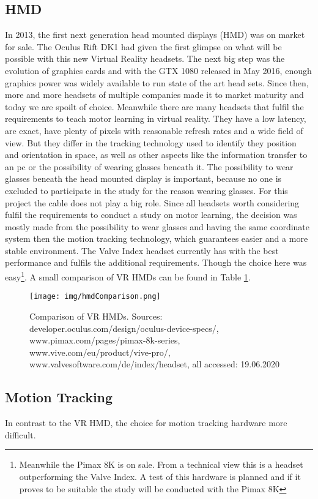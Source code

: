 \subsection{HMD}
In 2013, the first next generation head mounted displays (HMD) was on market for sale. The Oculus Rift DK1 had given the first glimpse on what will be possible with this new Virtual Reality headsets. The next big step was the evolution of graphics cards and with the GTX 1080 released in May 2016, enough graphics power was widely available to run state of the art head sets. Since then, more and more headsets of multiple companies made it to market maturity and today we are spoilt of choice. Meanwhile there are many headsets that fulfil the requirements to teach motor learning in virtual reality. They have a low latency,  are exact, have plenty of pixels with reasonable refresh rates and a wide field of view. But they differ in the tracking technology used to identify they position and orientation in space, as well as other aspects like the information transfer to an pc or the possibility of wearing glasses beneath it. The possibility to wear glasses beneath the head mounted display is important, because no one is excluded to participate in the study for the reason wearing glasses. For this project the cable does not play a big role. Since all headsets worth considering fulfil the requirements to conduct a study on motor learning, the decision was mostly made from the possibility to wear glasses and having the same coordinate system then the motion tracking technology, which guarantees easier and a more stable environment. The Valve Index headset currently has with the best performance and fulfils the additional requirements. Though the choice here was easy\footnote{Meanwhile the Pimax 8K is on sale. From a technical view this is a headset outperforming the Valve Index. A test of this hardware is planned and if it proves to be suitable the study will be conducted with the Pimax 8K}. A small comparison of VR HMDs can be found in Table \ref{fig:hmdComparison}.
\begin{figure}
	\centering
	\texttt{[image: img/hmdComparison.png]}
	\caption{Comparison of VR HMDs. Sources: developer.oculus.com/design/oculus-device-specs/, www.pimax.com/pages/pimax-8k-series, www.vive.com/eu/product/vive-pro/, www.valvesoftware.com/de/index/headset, all accessed: 19.06.2020
	}
	\label{fig:hmdComparison}
\end{figure}
\subsection{Motion Tracking}
In contrast to the VR HMD, the choice for motion tracking hardware more difficult.\\

